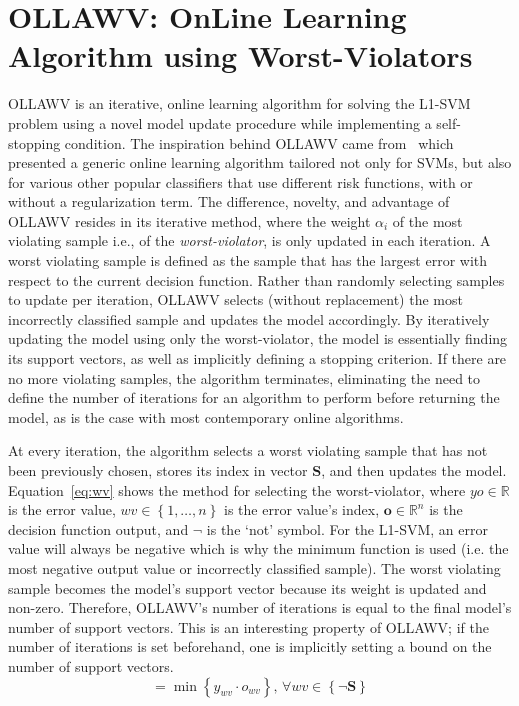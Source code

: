 \documentclass[reqno]{vcuthesis}
\newcommand{\set}[1]{{\left\{#1\right\}}}
\newcommand{\reals}{{\mathbb{R}}}
\numberwithin{equation}{chapter}
\begin{document}
\section{OLLAWV: OnLine Learning Algorithm using Worst-Violators}
OLLAWV is an iterative, online learning algorithm for solving the L1-SVM problem using a novel model update procedure while implementing a self-stopping condition. The inspiration behind OLLAWV came from~\cite{kecman2016fast} which presented a generic online learning algorithm tailored not only for SVMs, but also for various other popular classifiers that use different risk functions, with or without a regularization term. The difference, novelty, and advantage of OLLAWV resides in its iterative method, where the weight $\alpha_i$ of the most violating sample i.e., of the \textit{worst-violator}, is only updated in each iteration. A worst violating sample is defined as the sample that has the largest error with respect to the current decision function. Rather than randomly selecting samples to update per iteration, OLLAWV selects (without replacement) the most incorrectly classified sample and updates the model accordingly. By iteratively updating the model using only the worst-violator, the model is essentially finding its support vectors, as well as implicitly defining a stopping criterion. If there are no more violating samples, the algorithm terminates, eliminating the need to define the number of iterations for an algorithm to perform before returning the model, as is the case with most contemporary online algorithms. 

At every iteration, the algorithm selects a worst violating sample that has not been previously chosen, stores its index in vector $\bm S$, and then updates the model. Equation~\ref{eq:wv} shows the method for selecting the worst-violator, where $yo \in \reals$ is the error value, $wv \in \set{1, \ldots, n}$ is the error value's index, $\bm o \in \reals^n$ is the decision function output, and $\neg$ is the `not' symbol. For the L1-SVM, an error value will always be negative which is why the minimum function is used (i.e. the most negative output value or incorrectly classified sample). The worst violating sample becomes the model's support vector because its weight is updated and non-zero. Therefore, OLLAWV's number of iterations is equal to the final model's number of support vectors. This is an interesting property of OLLAWV; if the number of iterations is set beforehand, one is implicitly setting a bound on the number of support vectors. 
\begin{equation}
[yo, wv] = \min \set{y_{wv} \cdot o_{wv}},\, \forall wv \in \set{\neg \bm S}
\label{eq:wv}
\end{equation}
\end{document}
